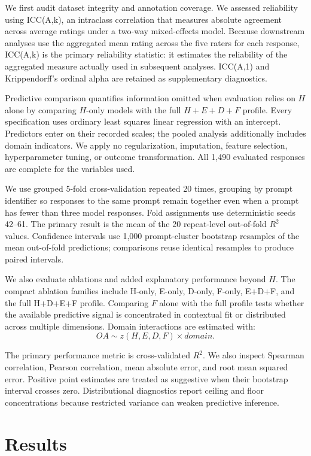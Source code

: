 \documentclass[manuscript,review,anonymous]{acmart}
\begin{document}
We first audit dataset integrity and annotation coverage. We assessed reliability using ICC(A,k), an intraclass correlation that measures absolute agreement across average ratings under a two-way mixed-effects model. Because downstream analyses use the aggregated mean rating across the five raters for each response, ICC(A,k) is the primary reliability statistic: it estimates the reliability of the aggregated measure actually used in subsequent analyses. ICC(A,1) and Krippendorff's ordinal alpha are retained as supplementary diagnostics.

Predictive comparison quantifies information omitted when evaluation relies on $H$ alone by comparing $H$-only models with the full $H+E+D+F$ profile. Every specification uses ordinary least squares linear regression with an intercept. Predictors enter on their recorded scales; the pooled analysis additionally includes domain indicators. We apply no regularization, imputation, feature selection, hyperparameter tuning, or outcome transformation. All 1,490 evaluated responses are complete for the variables used.

We use grouped 5-fold cross-validation repeated 20 times, grouping by prompt identifier so responses to the same prompt remain together even when a prompt has fewer than three model responses. Fold assignments use deterministic seeds 42--61. The primary result is the mean of the 20 repeat-level out-of-fold $R^2$ values. Confidence intervals use 1,000 prompt-cluster bootstrap resamples of the mean out-of-fold predictions; comparisons reuse identical resamples to produce paired intervals.

We also evaluate ablations and added explanatory performance beyond $H$. The compact ablation families include H-only, E-only, D-only, F-only, E+D+F, and the full H+D+E+F profile. Comparing $F$ alone with the full profile tests whether the available predictive signal is concentrated in contextual fit or distributed across multiple dimensions. Domain interactions are estimated with:
\[
OA \sim z(H,E,D,F)\times domain.
\]

The primary performance metric is cross-validated $R^2$. We also inspect Spearman correlation, Pearson correlation, mean absolute error, and root mean squared error. Positive point estimates are treated as suggestive when their bootstrap interval crosses zero. Distributional diagnostics report ceiling and floor concentrations because restricted variance can weaken predictive inference.

\section{Results}
\end{document}
